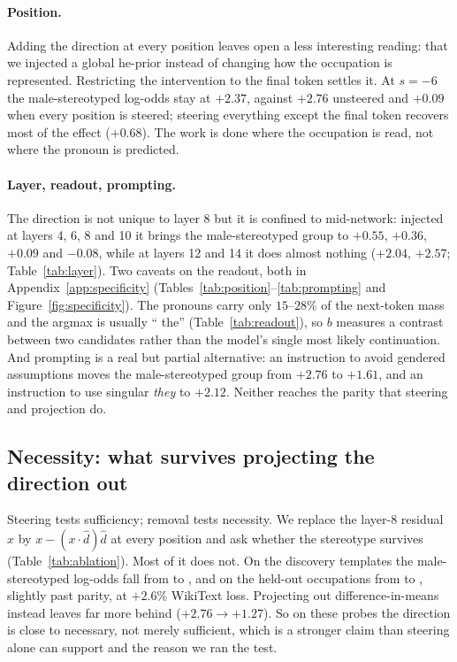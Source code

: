 \documentclass{article}
\begin{document}
\paragraph{Position.} Adding the direction at every position leaves open a less
interesting reading: that we injected a global he-prior instead of changing how the
occupation is represented. Restricting the intervention to the final token settles it. At
$s=-6$ the male-stereotyped log-odds stay at $+2.37$, against $+2.76$ unsteered and $+0.09$
when every position is steered; steering everything except the final token recovers most of
the effect ($+0.68$). The work is done where the occupation is read, not where the pronoun
is predicted.

\paragraph{Layer, readout, prompting.} The direction is not unique to layer 8 but it is
confined to mid-network: injected at layers 4, 6, 8 and 10 it brings the male-stereotyped
group to $+0.55$, $+0.36$, $+0.09$ and $-0.08$, while at layers 12 and 14 it does almost
nothing ($+2.04$, $+2.57$; Table~\ref{tab:layer}). Two caveats on the readout, both in
Appendix~\ref{app:specificity} (Tables~\ref{tab:position}--\ref{tab:prompting} and
Figure~\ref{fig:specificity}). The pronouns carry only $15$--$28\%$ of the next-token mass
and the argmax is usually `` the'' (Table~\ref{tab:readout}), so $b$ measures a contrast
between two candidates rather than the model's single most likely continuation. And prompting is a real but
partial alternative: an instruction to avoid gendered assumptions moves the
male-stereotyped group from $+2.76$ to $+1.61$, and an instruction to use singular
\emph{they} to $+2.12$. Neither reaches the parity that steering and projection do.

\subsection{Necessity: what survives projecting the direction out}
\label{sec:ablation}

Steering tests sufficiency; removal tests necessity. We replace the layer-8 residual $x$
by $x - (x\cdot\hat d)\hat d$ at every position and ask whether the stereotype survives
(Table~\ref{tab:ablation}). Most of it does not. On the discovery templates the
male-stereotyped log-odds fall from \BaseMale{} to \ProjTpl{} \ProjTplCI{}, and on the
held-out occupations from \HeldBase{} to \ProjHeld{} \ProjHeldCI{}, slightly past parity, at
$+2.6\%$ WikiText loss. Projecting out difference-in-means instead leaves far more
behind ($+2.76 \to +1.27$). So on these probes the direction is close to necessary, not
merely sufficient, which is a stronger claim than steering alone can support and the
reason we ran the test.
\end{document}
